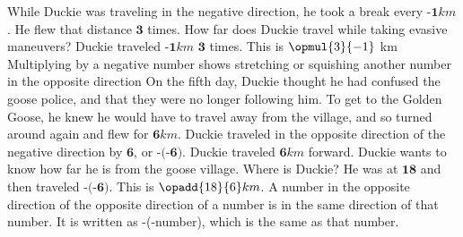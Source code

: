 {}
{While Duckie was traveling in the negative direction, he took a break every $\textbf{-1} km$. He flew that distance  $\textbf{3}$ times. How far does Duckie travel while taking evasive maneuvers?}
{Duckie traveled $\textbf{-1} km$ $\textbf{3}$ times. This is $\opmul{3}{-1}$ km}
{Multiplying by a negative number shows stretching or squishing another number in the opposite direction}
{}
{On the fifth day, Duckie thought he had confused the goose police, and that they were no longer following him. To get to the Golden Goose, he knew he would have to travel away from the village, and so turned around again and flew for $\textbf{6} km$. Duckie traveled in the opposite direction of the negative direction by $\textbf{6}$, or $\textbf{-(-6)}$. Duckie traveled $\textbf{6} km$ forward. Duckie wants to know how far he is from the goose village. Where is Duckie?}
{He was at $\textbf{18}$ and then traveled $\textbf{-(-6)}$. This is $\opadd{18}{6} km$.}
{A number in the opposite direction of the opposite direction of a number is in the same direction of that number. It is written as -(-number), which is the same as  that number.}
{}
